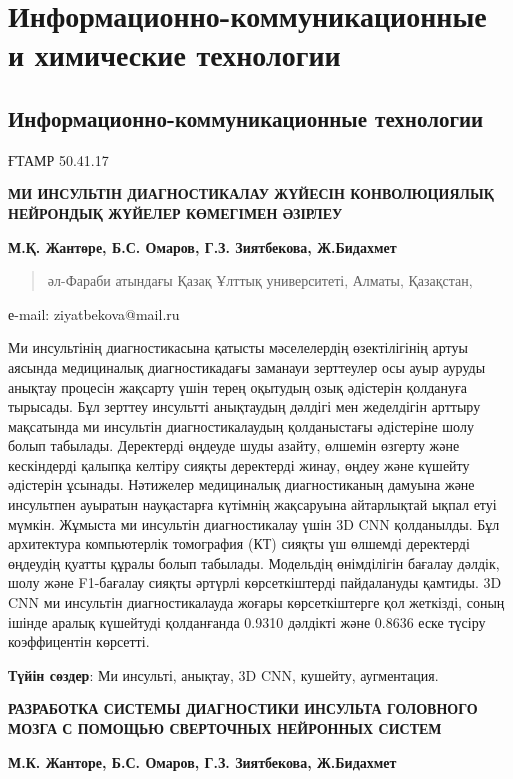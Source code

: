 \let\cleardoublepage\clearpage
\part{Информационно-коммуникационные и химические технологии}
\chapter{Информационно-коммуникационные технологии}

ҒТАМР 50.41.17

\textbf{МИ ИНСУЛЬТІН ДИАГНОСТИКАЛАУ ЖҮЙЕСІН КОНВОЛЮЦИЯЛЫҚ НЕЙРОНДЫҚ
ЖҮЙЕЛЕР КӨМЕГІМЕН ӘЗІРЛЕУ}

\textbf{М.Қ. Жантөре, Б.С. Омаров, Г.З. Зиятбекова, Ж.Бидахмет}

\begin{quote}
әл-Фараби атындағы Қазақ Ұлттық университеті, Алматы, Қазақстан,
\end{quote}

е-mail: ziyatbekova@mail.ru

Ми инсультінің диагностикасына қатысты мәселелердің өзектілігінің артуы
аясында медициналық диагностикадағы заманауи зерттеулер осы ауыр ауруды
анықтау процесін жақсарту үшін терең оқытудың озық әдістерін қолдануға
тырысады. Бұл зерттеу инсультті анықтаудың дәлдігі мен жеделдігін
арттыру мақсатында ми инсультін диагностикалаудың қолданыстағы
әдістеріне шолу болып табылады. Деректерді өңдеуде шуды азайту, өлшемін
өзгерту және кескіндерді қалыпқа келтіру сияқты деректерді жинау, өңдеу
және күшейту әдістерін ұсынады. Нәтижелер медициналық диагностиканың
дамуына және инсультпен ауыратын науқастарға күтімнің жақсаруына
айтарлықтай ықпал етуі мүмкін. Жұмыста ми инсультін диагностикалау үшін
3D CNN қолданылды. Бұл архитектура компьютерлік томография (КТ) сияқты
үш өлшемді деректерді өңдеудің қуатты құралы болып табылады. Модельдің
өнімділігін бағалау дәлдік, шолу және F1-бағалау сияқты әртүрлі
көрсеткіштерді пайдалануды қамтиды. 3D CNN ми инсультін диагностикалауда
жоғары көрсеткіштерге қол жеткізді, соның ішінде аралық күшейтуді
қолданғанда 0.9310 дәлдікті және 0.8636 еске түсіру коэффицентін
көрсетті.

\textbf{Түйін сөздер}: Ми инсульті, анықтау, 3D CNN, кушейту,
аугментация.

\textbf{РАЗРАБОТКА СИСТЕМЫ ДИАГНОСТИКИ ИНСУЛЬТА ГОЛОВНОГО МОЗГА С
ПОМОЩЬЮ СВЕРТОЧНЫХ НЕЙРОННЫХ СИСТЕМ}

\textbf{М.К. Жанторе, Б.С. Омаров, Г.З. Зиятбекова, Ж.Бидахмет}

